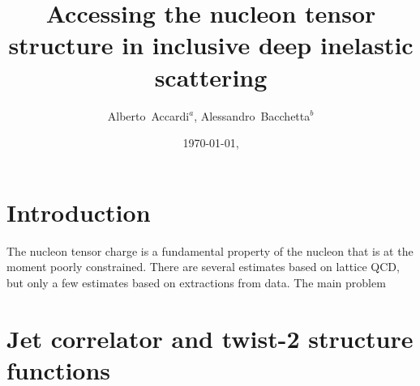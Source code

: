 \documentclass[preprintnumbers,floatfix,nofootinbib]{revtex4}
\begin{document}


\title{Accessing the nucleon tensor structure in inclusive deep inelastic scattering} 

\author{Alberto~Accardi$^{a}$, Alessandro~Bacchetta$^{b}$} 

\date{\today, \currenttime}

\begin{abstract}

\end{abstract}



\maketitle


\section{Introduction}

The nucleon tensor charge is a fundamental property of the nucleon that is at
the moment poorly constrained. There are several estimates based on lattice
QCD, but only a few estimates based on extractions from data. The main problem 

\section{Jet correlator and twist-2 structure functions}
\end{document}
